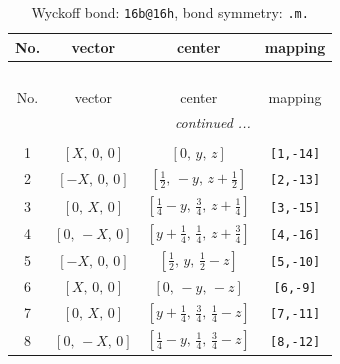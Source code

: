 \documentclass[fleqn,8pt]{jsarticle}
\begin{document}
\renewcommand{\arraystretch}{1.2}
\begin{longtable}{cccc}
\caption{Wyckoff bond: {\tt 16b@16h}, bond symmetry: {\tt .m.}}
 \\
 \hline \hline
No. & vector & center & mapping \\ \hline \endfirsthead

\multicolumn{3}{l}{\tablename\ \thetable{}} \\
 \hline \hline
No. & vector & center & mapping \\ \hline \endhead

 \hline \hline
\multicolumn{3}{r}{\footnotesize\it continued ...} \\ \endfoot

 \hline \hline
\multicolumn{3}{r}{} \\ \endlastfoot

1 & $\left[ X,\, 0,\, 0 \right]$ & $\left[ 0,\, y,\, z \right]$ & {\tt [1,-14]} \\ \hline
2 & $\left[ - X,\, 0,\, 0 \right]$ & $\left[ \frac{1}{2},\, - y,\, z + \frac{1}{2} \right]$ & {\tt [2,-13]} \\ \hline
3 & $\left[ 0,\, X,\, 0 \right]$ & $\left[ \frac{1}{4} - y,\, \frac{3}{4},\, z + \frac{1}{4} \right]$ & {\tt [3,-15]} \\ \hline
4 & $\left[ 0,\, - X,\, 0 \right]$ & $\left[ y + \frac{1}{4},\, \frac{1}{4},\, z + \frac{3}{4} \right]$ & {\tt [4,-16]} \\ \hline
5 & $\left[ - X,\, 0,\, 0 \right]$ & $\left[ \frac{1}{2},\, y,\, \frac{1}{2} - z \right]$ & {\tt [5,-10]} \\ \hline
6 & $\left[ X,\, 0,\, 0 \right]$ & $\left[ 0,\, - y,\, - z \right]$ & {\tt [6,-9]} \\ \hline
7 & $\left[ 0,\, X,\, 0 \right]$ & $\left[ y + \frac{1}{4},\, \frac{3}{4},\, \frac{1}{4} - z \right]$ & {\tt [7,-11]} \\ \hline
8 & $\left[ 0,\, - X,\, 0 \right]$ & $\left[ \frac{1}{4} - y,\, \frac{1}{4},\, \frac{3}{4} - z \right]$ & {\tt [8,-12]} \\
\end{longtable}
\renewcommand{\arraystretch}{1.2}
\end{document}

